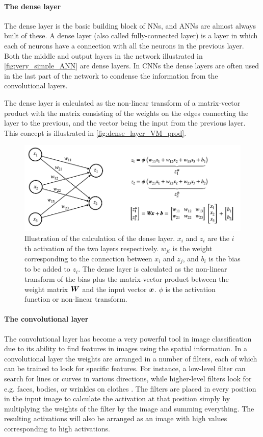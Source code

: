 \paragraph{The dense layer}
The dense layer is the basic building block of NNs, and ANNs are almost always built of these. A dense layer (also called fully-connected layer) is a layer in which each of neurons have a connection with all the neurons in the previous layer. Both the middle and output layers in the network illustrated in \autoref{fig:very_simple_ANN} are dense layers. In CNNs the dense layers are often used in the last part of the network to condense the information from the convolutional layers.

The dense layer is calculated as the non-linear transform of a matrix-vector product with the matrix consisting of the weights on the edges connecting the layer to the previous, and the vector being the input from the previous layer. This concept is illustrated in \autoref{fig:dense_layer_VM_prod}.
\begin{figure}
    \centering
    \captionsetup{width=.95\linewidth}
    \includegraphics[width=\linewidth]{Pics/02_Theory/dense_layer_VM_prod.png}
    \caption{Illustration of the calculation of the dense layer. $x_i$ and $z_i$ are the $i$th activation of the two layers respectively. $w_{ji}$ is the weight corresponding to the connection between $x_i$ and $z_j$, and $b_i$ is the bias to be added to $z_i$. The dense layer is calculated as the non-linear transform of the bias plus the matrix-vector product between the weight matrix $\boldsymbol{W}$ and the input vector $\boldsymbol{x}$. $\phi$ is the activation function or non-linear transform.}
    \label{fig:dense_layer_VM_prod}
\end{figure}

\paragraph{The convolutional layer}
The convolutional layer has become a very powerful tool in image classification due to its ability to find features in images using the spatial information. In a convolutional layer the weights are arranged in a number of filters, each of which can be trained to look for specific features. For instance, a low-level filter can search for lines or curves in various directions, while higher-level filters look for e.g. faces, bodies, or wrinkles on clothes \cite{Yosinski2015}. The filters are placed in every position in the input image to calculate the activation at that position simply by multiplying the weights of the filter by the image and summing everything. The resulting activations will also be arranged as an image with high values corresponding to high activations.

